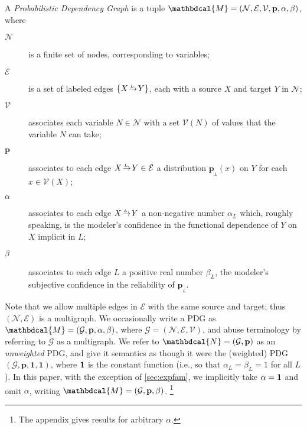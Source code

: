 \documentclass[letterpaper]{article} %
\theoremstyle{plain}
\theoremstyle{definition}
\theoremstyle{remark}
\newcommand\mat[1]{\mathbf{#1}}
\newcommand{\bp}[1][L]{\mat{p}_{\!_{#1}\!}}
\newcommand{\V}{\mathcal V}
\newcommand{\N}{\mathcal N}
\newcommand{\Ed}{\mathcal E}
\newcommand{\dg}[1]{\mathbdcal{#1}}
\newcommand{\Gr}{\mathcal G}
\newcommand{\ed}[3]{#2\!%
  \overset{\smash{\mskip-5mu\raisebox{-1pt}{$\scriptscriptstyle
        #1$}}}{\rightarrow}\! #3}
\newcommand{\notation}[1]{\ignorespaces} %
\newcommand\vfull[1]{} %
\begin{document}
\vfull{\footnote{In the factor graph literature,
          especially with regard to loopy belief propagation
          \cite{wainwright2007graphical}, it is common to
          call a collection of marginals that are not
          necessarily all compatible with a distribution
          \emph{pseudomarginals}, making a PDG in some sense a
          collection of `conditional' pseudomarginals. This
          gives an alternate, more technically precise
          expansion of PDG as ``Pseudomarginal Dependency Graph''.}}

\begin{defn}\label{def:model}
A \emph{Probabilistic Dependency Graph}
is a tuple $\dg M = (\N,\Ed,\V,\mat p, \alpha, \beta)$, where 

\begin{description}%
	\item[$\N$] \notation{$:\Set$}%
		is a finite set of nodes, corresponding to variables;
	\item[$\Ed$] \notation{$\subseteq \N \times \N \times \mathit{Label}$}%
		is a set of labeled edges $\{ \ed LXY \}$, each with a source 
		$X$ and target $Y$ in $\N$;
	\item[$\V$] \notation{$\N \to \mathbf{Set}$}%
		associates each variable $N \in \N$ with a set $\V(N)$ of values that the variable $N$ can take;
  	\item[$\mat p$] \notation{$:\big(\!({A,B,\ell})\colon\!\Ed \big) \to \V(A) \to \Delta\V(B)$}%
	associates to each edge $\ed LXY \in \Ed$
	a distribution $\bp(x)$ on $Y$ for each $x \in \V(X)$; 

\item[$\alpha$] \notation{$:\Ed \to [0,1]$}
associates to each edge $\ed LXY$ a non-negative number $\alpha_L$ which,
roughly speaking, is the modeler's confidence in the functional
dependence of $Y$ on $X$ implicit in $L$; 
\item[$\beta$] \notation{$:\Ed \to \mathbb R^+$}
associates to each edge $L$ a positive real number $\beta_L$,
the modeler's 
subjective confidence in the reliability of
$\bp$. 
\end{description}
Note that we allow multiple edges in $\Ed$ with the same source and
target; thus $(\N,\Ed)$ is a multigraph.  We occasionally write a PDG
as $\dg M = (\Gr,\mat p, \alpha,\beta)$, where $\Gr = (\N,\Ed,\V)$, and
abuse terminology by referring to $\Gr$ as a multigraph.
We refer to 
${\dg N} = (\Gr, \mat p)$ as an \emph{unweighted} PDG,
and give it semantics as though it were the (weighted) PDG $(\Gr, \mat p, \mat 1, \mat 1)$, where
$\bf 1$ is the constant function (i.e., so that $\alpha_L = \beta_L = 1$ for all $L$). 
In this paper, with the exception of \cref{sec:expfam},  we implicitly take $\alpha = {\bf 1}$
and omit $\alpha$, writing $\dg M = (\Gr, \mat p, \beta)$.%
\footnote{The appendix gives results for arbitrary $\alpha$.} 
\end{defn}
\end{document}
